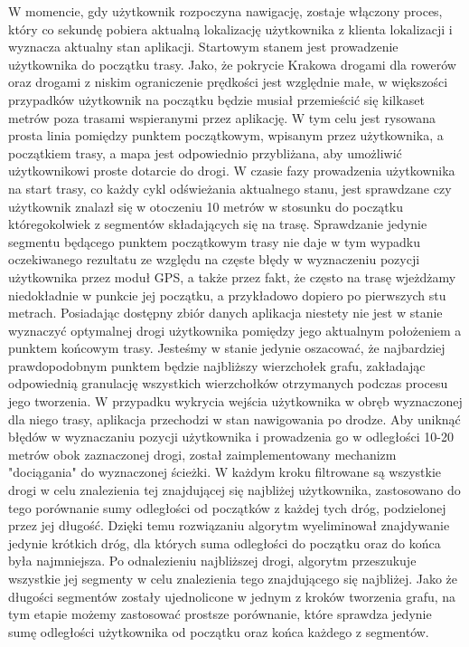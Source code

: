 W momencie, gdy użytkownik rozpoczyna nawigację, zostaje włączony proces, który co sekundę pobiera aktualną lokalizację użytkownika z klienta lokalizacji i wyznacza aktualny stan aplikacji. Startowym stanem jest prowadzenie użytkownika do początku trasy. Jako, że pokrycie Krakowa drogami dla rowerów oraz drogami z niskim ograniczenie prędkości jest względnie małe, w większości przypadków użytkownik na początku będzie musiał przemieścić się kilkaset metrów poza trasami wspieranymi przez aplikację. W tym celu jest rysowana prosta linia pomiędzy punktem początkowym, wpisanym przez użytkownika, a początkiem trasy, a mapa jest odpowiednio przybliżana, aby umożliwić użytkownikowi proste dotarcie do drogi. \newline
W czasie fazy prowadzenia użytkownika na start trasy, co każdy cykl odświeżania aktualnego stanu, jest sprawdzane czy użytkownik znalazł się w otoczeniu 10 metrów w stosunku do początku któregokolwiek z segmentów składających się na trasę. Sprawdzanie jedynie segmentu będącego punktem początkowym trasy nie daje w tym wypadku oczekiwanego rezultatu ze względu na częste błędy w wyznaczeniu pozycji użytkownika przez moduł GPS, a także przez fakt, że często na trasę wjeżdżamy niedokładnie w punkcie jej początku, a przykładowo dopiero po pierwszych stu metrach. Posiadając dostępny zbiór danych aplikacja niestety nie jest w stanie wyznaczyć optymalnej drogi użytkownika pomiędzy jego aktualnym położeniem a punktem końcowym trasy. Jesteśmy w stanie jedynie oszacować, że najbardziej prawdopodobnym punktem będzie najbliższy wierzchołek grafu, zakładając odpowiednią granulację wszystkich wierzchołków otrzymanych podczas procesu jego tworzenia. \newline
W przypadku wykrycia wejścia użytkownika w obręb wyznaczonej dla niego trasy, aplikacja przechodzi w stan nawigowania po drodze. Aby uniknąć błędów w wyznaczaniu pozycji użytkownika i prowadzenia go w odległości 10-20 metrów obok zaznaczonej drogi, został zaimplementowany mechanizm "dociągania" do wyznaczonej ścieżki. W każdym kroku filtrowane są wszystkie drogi w celu znalezienia tej znajdującej się najbliżej użytkownika, zastosowano do tego porównanie sumy odległości od początków z każdej tych dróg, podzielonej przez jej długość. Dzięki temu rozwiązaniu algorytm wyeliminował znajdywanie jedynie krótkich dróg, dla których suma odległości do początku oraz do końca była najmniejsza. \newline
Po odnalezieniu najbliższej drogi, algorytm przeszukuje wszystkie jej segmenty w celu znalezienia tego znajdującego się najbliżej. Jako że długości segmentów zostały ujednolicone w jednym z kroków tworzenia grafu, na tym etapie możemy zastosować prostsze porównanie, które sprawdza jedynie sumę odległości użytkownika od początku oraz końca każdego z segmentów.

